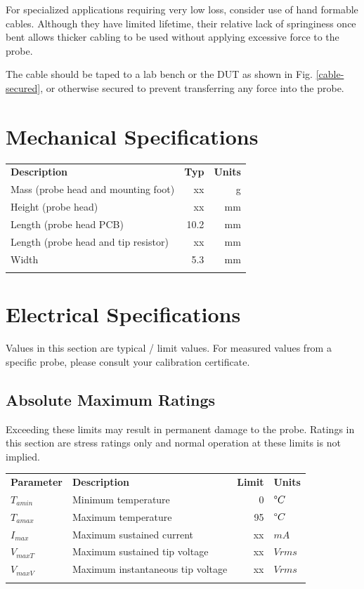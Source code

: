 \documentclass[11pt]{article}
\newcommand{\thinhline}{\Xhline{1\arrayrulewidth}}
\newcommand{\thickhline}{\Xhline{2.5\arrayrulewidth}}
\begin{document}
For specialized applications requiring very low loss, consider use of hand formable cables. Although they have limited
lifetime, their relative lack of springiness once bent allows thicker cabling to be used without applying excessive
force to the probe.

The cable should be taped to a lab bench or the DUT as shown in Fig. \ref{cable-secured}, or otherwise secured to
prevent transferring any force into the probe.


\pagebreak
\section{Mechanical Specifications}

\begin{tabularx}{10cm}{Xrr}
\thickhline
\textbf{Description} & \textbf{Typ} & \textbf{Units} \\
\thickhline
Mass (probe head and mounting foot) & xx & g\\
\thinhline
Height (probe head) & xx & mm\\
\thinhline
Length (probe head PCB) & 10.2 & mm\\
\thinhline
Length (probe head and tip resistor) & xx & mm\\
\thinhline
Width & 5.3 & mm\\
\thickhline
\end{tabularx}

\pagebreak
\section{Electrical Specifications}

Values in this section are typical / limit values. For measured values from a specific probe, please consult your
calibration certificate.

\subsection{Absolute Maximum Ratings}

Exceeding these limits may result in permanent damage to the probe. Ratings in this section are stress ratings only and
normal operation at these limits is not implied.

\begin{tabularx}{12cm}{lXrl}
\thickhline
\textbf{Parameter} & \textbf{Description} & \textbf{Limit} & \textbf{Units} \\
\thickhline
$T_{amin}$ & Minimum temperature & 0 & $ \degree C$ \\
\thinhline
$T_{amax}$ & Maximum temperature & 95 & $ \degree C$ \\
\thinhline
$I_{max}$ & Maximum sustained current & xx & $ mA $ \\
\thinhline
$V_{maxT}$ & Maximum sustained tip voltage & xx & $ Vrms $ \\
\thinhline
$V_{maxV}$ & Maximum instantaneous tip voltage & xx & $ Vrms $ \\
\thickhline
\end{tabularx}
\end{document}
